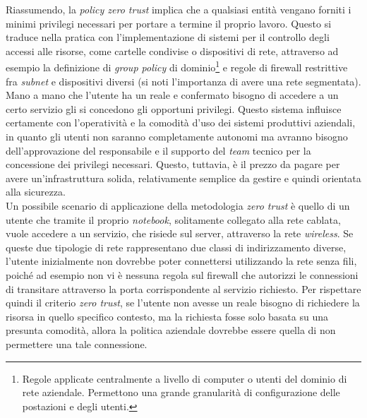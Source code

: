 \documentclass[target=bach,aauheader=]{thud}
\begin{document}
Riassumendo, la \textit{policy zero trust} implica che a qualsiasi entità vengano forniti i minimi privilegi necessari per portare a termine il proprio lavoro. Questo si traduce nella pratica con l'implementazione di sistemi per il controllo degli accessi alle risorse, come cartelle condivise o dispositivi di rete, attraverso ad esempio la definizione di \textit{group policy} di dominio\footnote{Regole applicate centralmente a livello di computer o utenti del dominio di rete aziendale. Permettono una grande granularità di configurazione delle postazioni e degli utenti.} e regole di firewall restrittive fra \textit{subnet} e dispositivi diversi (si noti l'importanza di avere una rete segmentata). Mano a mano che l'utente ha un reale e confermato bisogno di accedere a un certo servizio gli si concedono gli opportuni privilegi. Questo sistema influisce certamente con l'operatività e la comodità d'uso dei sistemi produttivi aziendali, in quanto gli utenti non saranno completamente autonomi ma avranno bisogno dell'approvazione del responsabile e il supporto del \textit{team} tecnico per la concessione dei privilegi necessari. Questo, tuttavia, è il prezzo da pagare per avere un'infrastruttura solida, relativamente semplice da gestire e quindi orientata alla sicurezza.
\\ Un possibile scenario di applicazione della metodologia \textit{zero trust} è quello di un utente che tramite il proprio \textit{notebook}, solitamente collegato alla rete cablata, vuole accedere a un servizio, che risiede sul server, attraverso la rete \textit{wireless}. Se queste due tipologie di rete rappresentano due classi di indirizzamento diverse, l'utente inizialmente non dovrebbe poter connettersi utilizzando la rete senza fili, poiché ad esempio non vi è nessuna regola sul firewall che autorizzi le connessioni di transitare attraverso la porta corrispondente al servizio richiesto. Per rispettare quindi il criterio \textit{zero trust}, se l'utente non avesse un reale bisogno di richiedere la risorsa in quello specifico contesto, ma la richiesta fosse solo basata su una presunta comodità, allora la politica aziendale dovrebbe essere quella di non permettere una tale connessione.
\end{document}

